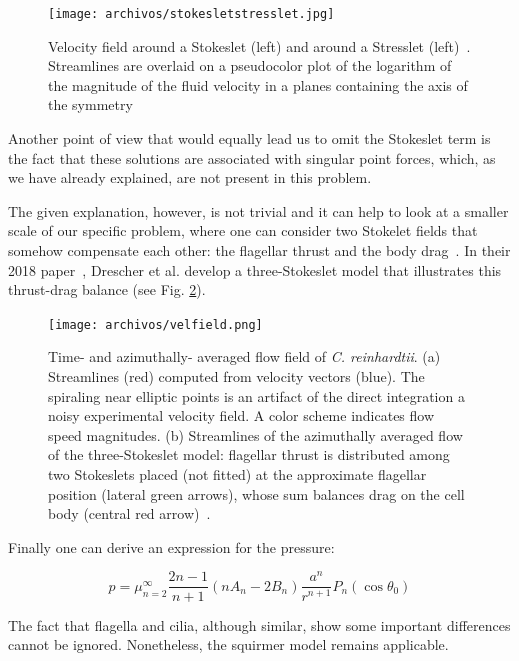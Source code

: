 \begin{figure}[H]
	\centering
	\texttt{[image: archivos/stokesletstresslet.jpg]}
	\caption{Velocity field around a Stokeslet (left) and around a Stresslet (left)~\cite{Singh2015}. Streamlines are overlaid on a pseudocolor plot of the logarithm of the magnitude of the fluid velocity in a planes containing the axis of the symmetry}
	\label{stokeslet_stresslet}
\end{figure}

Another point of view that would equally lead us to omit the Stokeslet term is the fact that these solutions are associated with singular point forces, which, as we have already explained, are not present in this problem. 

The given explanation, however, is not trivial and it can help to look at a smaller scale of our specific problem, where one can consider two Stokelet fields that somehow compensate each other: the flagellar thrust and the body drag~\cite{Lokenath}. In their 2018 paper~\cite{Drescher2010}, Drescher et al. develop a three-Stokeslet model that illustrates this thrust-drag balance (see Fig. \ref{drag_thrust}).

\begin{figure}[H]
	\centering
	\texttt{[image: archivos/velfield.png]}
	\caption{Time- and azimuthally- averaged flow field of \textit{C. reinhardtii}. (a) Streamlines (red) computed from velocity vectors (blue). The spiraling near elliptic points is an artifact of the direct integration a noisy experimental velocity field. A color scheme indicates flow speed magnitudes. (b) Streamlines of the azimuthally averaged flow of the three-Stokeslet model: flagellar thrust is distributed among two Stokeslets placed (not fitted) at the approximate flagellar position (lateral green arrows), whose sum balances drag on the cell body (central red arrow)~\cite{Drescher2010}.}
	\label{drag_thrust}
\end{figure}

Finally one can derive an expression for the pressure:

\begin{equation}
p=\mu_{n=2}^{\infty} \frac{2 n-1}{n+1}\left(n A_{n}-2 B_{n}\right) \frac{a^{n}}{r^{n+1}} P_{n}\left(\cos \theta_{0}\right)
\end{equation}

The fact that flagella and cilia, although similar, show some important differences cannot be ignored. Nonetheless, the squirmer model remains applicable.

